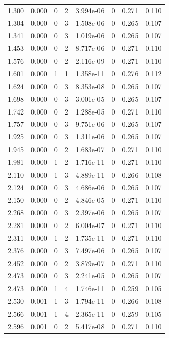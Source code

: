 \documentclass[preview]{standalone}
\begin{document}
{{\begin{tabular}{L{1.2cm}C{1.2cm} C{0.3cm}C{0.5cm} C{1.4cm}C{1.4cm} C{1.4cm}C{1.4cm}}
  1.300  &  0.000  & 0     &  2 &  3.994e-06  & 0  & 0.271 &  0.110   \\ 
  1.304  &  0.000  & 0     &  3 &  1.508e-06  & 0  & 0.265 &  0.107   \\ 
  1.341  &  0.000  & 0     &  3 &  1.019e-06  & 0  & 0.265 &  0.107   \\ 
  1.453  &  0.000  & 0     &  2 &  8.717e-06  & 0  & 0.271 &  0.110   \\ 
  1.576  &  0.000  & 0     &  2 &  2.116e-09  & 0  & 0.271 &  0.110   \\ 
  1.601  &  0.000  & 1     &  1 &  1.358e-11  & 0  & 0.276 &  0.112   \\ 
  1.624  &  0.000  & 0     &  3 &  8.353e-08  & 0  & 0.265 &  0.107   \\ 
  1.698  &  0.000  & 0     &  3 &  3.001e-05  & 0  & 0.265 &  0.107   \\ 
  1.742  &  0.000  & 0     &  2 &  1.288e-05  & 0  & 0.271 &  0.110   \\ 
  1.757  &  0.000  & 0     &  3 &  9.751e-06  & 0  & 0.265 &  0.107   \\ 
  1.925  &  0.000  & 0     &  3 &  1.311e-06  & 0  & 0.265 &  0.107   \\ 
  1.945  &  0.000  & 0     &  2 &  1.683e-07  & 0  & 0.271 &  0.110   \\ 
  1.981  &  0.000  & 1     &  2 &  1.716e-11  & 0  & 0.271 &  0.110   \\ 
  2.110  &  0.000  & 1     &  3 &  4.889e-11  & 0  & 0.266 &  0.108   \\ 
  2.124  &  0.000  & 0     &  3 &  4.686e-06  & 0  & 0.265 &  0.107   \\ 
  2.150  &  0.000  & 0     &  2 &  4.846e-05  & 0  & 0.271 &  0.110   \\ 
  2.268  &  0.000  & 0     &  3 &  2.397e-06  & 0  & 0.265 &  0.107   \\ 
  2.281  &  0.000  & 0     &  2 &  6.004e-07  & 0  & 0.271 &  0.110   \\ 
  2.311  &  0.000  & 1     &  2 &  1.735e-11  & 0  & 0.271 &  0.110   \\ 
  2.376  &  0.000  & 0     &  3 &  7.497e-06  & 0  & 0.265 &  0.107   \\ 
  2.452  &  0.000  & 0     &  2 &  3.879e-07  & 0  & 0.271 &  0.110   \\ 
  2.473  &  0.000  & 0     &  3 &  2.241e-05  & 0  & 0.265 &  0.107   \\ 
  2.473  &  0.000  & 1     &  4 &  1.746e-11  & 0  & 0.259 &  0.105   \\ 
  2.530  &  0.001  & 1     &  3 &  1.794e-11  & 0  & 0.266 &  0.108   \\ 
  2.566  &  0.001  & 1     &  4 &  2.365e-11  & 0  & 0.259 &  0.105   \\ 
  2.596  &  0.001  & 0     &  2 &  5.417e-08  & 0  & 0.271 &  0.110   \\ 
\hline 
\end{tabular} 

}}
\end{document}
